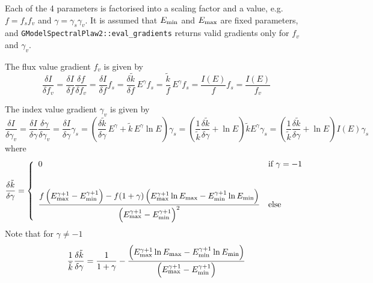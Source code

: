 \documentclass{article}[12pt,a4]
\begin{document}
Each of the 4 parameters is factorised into a scaling factor and a value, e.g.
$f=f_s f_v$ and $\gamma=\gamma_s \gamma_v$.
It is assumed that $E_{\rm min}$ and $E_{\rm max}$ are fixed parameters,
and {\tt GModelSpectralPlaw2::eval\_gradients} returns valid gradients only for 
$f_v$ and $\gamma_v$.

The flux value gradient $f_v$ is given by
\begin{equation}
\frac{\delta I}{\delta f_v} = 
  \frac{\delta I}{\delta f} \frac{\delta f}{\delta f_v} = 
  \frac{\delta I}{\delta f} f_s = 
  \frac{\delta \tilde{k}}{\delta f} \, E^{\gamma} f_s = 
  \frac{\tilde{k}}{f} \, E^{\gamma} f_s = 
  \frac{I(E)}{f} f_s =
  \frac{I(E)}{f_v}
\end{equation}

The index value gradient $\gamma_v$ is given by
\begin{equation}
\frac{\delta I}{\delta \gamma_v} =
  \frac{\delta I}{\delta \gamma} \frac{\delta \gamma}{\delta \gamma_v} = 
  \frac{\delta I}{\delta \gamma} \gamma_s = 
  \left( \frac{\delta \tilde{k}}{\delta \gamma} \, E^{\gamma} + \tilde{k} \, E^{\gamma} \ln E \right)  \gamma_s =
  \left( \frac{1}{\tilde{k}} \frac{\delta \tilde{k}}{\delta \gamma} + \ln E \right) \tilde{k} E^{\gamma} \gamma_s =
  \left( \frac{1}{\tilde{k}} \frac{\delta \tilde{k}}{\delta \gamma} + \ln E \right) I(E) \gamma_s
\end{equation}
where
\begin{equation}
   \frac{\delta \tilde{k}}{\delta \gamma} = \left \{
   \begin{array}{l l}
     \displaystyle
     0 & \mbox{if $\gamma = -1$} \\
     \\
     \\
     \displaystyle
      \frac{f \left( E_{\rm max}^{\gamma+1}-E_{\rm min}^{\gamma+1} \right) -
              f (1+\gamma) \left( E_{\rm max}^{\gamma+1} \ln E_{\rm max} - 
                                      E_{\rm min}^{\gamma+1} \ln E_{\rm min} \right)}
              {\left( E_{\rm max}^{\gamma+1}-E_{\rm min}^{\gamma+1} \right)^2}
         & \mbox{else}
   \end{array}
   \right .
\end{equation}
Note that for $\gamma \ne -1$
\begin{equation}
\frac{1}{\tilde{k}} \frac{\delta \tilde{k}}{\delta \gamma} =
  \frac{1}{1+\gamma} -
  \frac{\left( E_{\rm max}^{\gamma+1} \ln E_{\rm max} - 
                    E_{\rm min}^{\gamma+1} \ln E_{\rm min} \right)}
          {\left( E_{\rm max}^{\gamma+1}-E_{\rm min}^{\gamma+1} \right)}
\end{equation}
\end{document}
